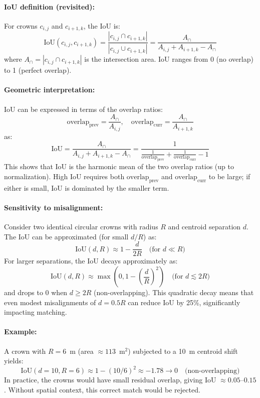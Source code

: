 \paragraph{IoU definition (revisited):}
For crowns $c_{i,j}$ and $c_{i+1,k}$, the IoU is:
\[
\text{IoU}(c_{i,j}, c_{i+1,k}) = \frac{|c_{i,j} \cap c_{i+1,k}|}{|c_{i,j} \cup c_{i+1,k}|} = \frac{A_{\cap}}{A_{i,j} + A_{i+1,k} - A_{\cap}}
\]
where $A_{\cap} = |c_{i,j} \cap c_{i+1,k}|$ is the intersection area. IoU ranges from 0 (no overlap) to 1 (perfect overlap).

\paragraph{Geometric interpretation:}
IoU can be expressed in terms of the overlap ratios:
\[
\text{overlap}_{\text{prev}} = \frac{A_{\cap}}{A_{i,j}}, \quad \text{overlap}_{\text{curr}} = \frac{A_{\cap}}{A_{i+1,k}}
\]
as:
\[
\text{IoU} = \frac{A_{\cap}}{A_{i,j} + A_{i+1,k} - A_{\cap}} = \frac{1}{\frac{1}{\text{overlap}_{\text{prev}}} + \frac{1}{\text{overlap}_{\text{curr}}} - 1}
\]
This shows that IoU is the harmonic mean of the two overlap ratios (up to normalization). High IoU requires both $\text{overlap}_{\text{prev}}$ and $\text{overlap}_{\text{curr}}$ to be large; if either is small, IoU is dominated by the smaller term.

\paragraph{Sensitivity to misalignment:}
Consider two identical circular crowns with radius $R$ and centroid separation $d$. The IoU can be approximated (for small $d/R$) as:
\[
\text{IoU}(d, R) \approx 1 - \frac{d}{2R} \quad \text{(for $d \ll R$)}
\]
For larger separations, the IoU decays approximately as:
\[
\text{IoU}(d, R) \approx \max\left(0, 1 - \left(\frac{d}{R}\right)^2\right) \quad \text{(for $d \lesssim 2R$)}
\]
and drops to 0 when $d \geq 2R$ (non-overlapping). This quadratic decay means that even modest misalignments of $d = 0.5R$ can reduce IoU by 25\%, significantly impacting matching.

\paragraph{Example:}
A crown with $R = 6$~m (area $\approx 113$~m$^2$) subjected to a 10~m centroid shift yields:
\[
\text{IoU}(d=10, R=6) \approx 1 - (10/6)^2 \approx -1.78 \to 0 \quad \text{(non-overlapping)}
\]
In practice, the crowns would have small residual overlap, giving IoU $\approx 0.05$--$0.15$. Without spatial context, this correct match would be rejected.


